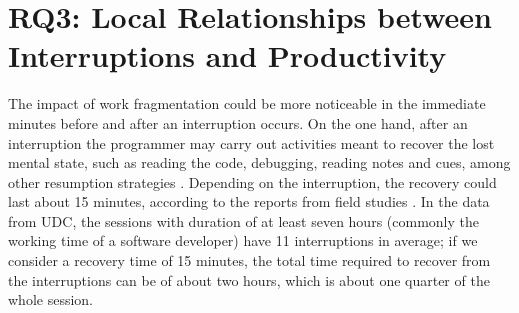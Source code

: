\documentclass[times]{smrauth}
\begin{document}
%
%
%

\section{RQ3: Local Relationships between Interruptions and Productivity}

The impact of work fragmentation could be more noticeable in the immediate minutes before and after an interruption occurs. On the one hand, after an interruption the programmer may carry out activities meant to recover the lost mental state, such as reading the code, debugging, reading notes and cues, among other resumption strategies \cite{PR11}. Depending on the interruption, the recovery could last about 15 minutes, according to the reports from field studies \cite{IH07, SBV98}. In the data from UDC, the sessions with duration of at least seven hours (commonly the working time of a software developer) have 11 interruptions in average; if we consider a recovery time of 15 minutes, the total time required to recover from the interruptions can be of about two hours, which is about one quarter of the whole session.
\end{document}
